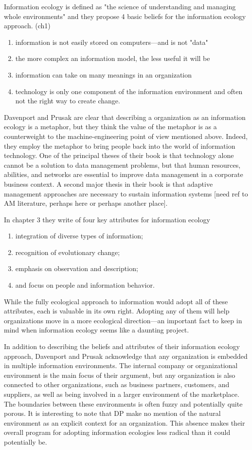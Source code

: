 Information ecology is defined as "the science of understanding and managing whole environments" and they propose 4 basic beliefs for the information ecology approach. (ch1)
\begin{enumerate}
\item information is not easily stored on computers—and is not "data"
\item the more complex an information model, the less useful it will be
\item information can take on many meanings in an organization
\item technology is only one component of the information environment and often not the right way to create change.
\end{enumerate}

Davenport and Prusak are clear that describing a organization as an information ecology is a metaphor, but they think the value of the metaphor is as a counterweight to the machine-engineering point of view mentioned above. Indeed, they employ the metaphor to bring people back into the world of information technology. One of the principal theses of their book is that technology alone cannot be a solution to data management problems, but that human resources, abilities, and networks are essential to improve data management in a corporate business context. A second major thesis in their book is that adaptive management approaches are necessary to sustain information systems [need ref to AM literature, perhaps here or perhaps another place].

In chapter 3 they write of four key attributes for information ecology

\begin{enumerate}
\item integration of diverse types of information;
\item recognition of evolutionary change;
\item emphasis on observation and description;
\item and focus on people and information behavior.
\end{enumerate}
While the fully ecological approach to information would adopt all of these attributes, each is valuable in its own right. Adopting any of them will help organizations move in a more ecological direction—an important fact to keep in mind when information ecology seems like a daunting project.

In addition to describing the beliefs and attributes of their information ecology approach, Davenport and Prusak acknowledge that any organization is embedded in multiple information environments. The internal company or organizational environment is the main focus of their argument, but any organization is also connected to other organizations, such as business partners, customers, and suppliers, as well as being involved in a larger environment of the marketplace. The boundaries between these environments is often fuzzy and potentially quite porous. It is interesting to note that DP make no mention of the natural environment as an explicit context for an organization. This absence makes their overall program for adopting information ecologies less radical than it could potentially be.

